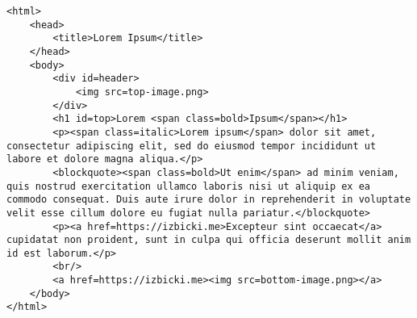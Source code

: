 \documentclass[10pt]{article}
\theoremstyle{definition}
\begin{document}
\newpage
\begin{lstlisting}
<html>
    <head>
        <title>Lorem Ipsum</title>
    </head>
    <body>
        <div id=header>
            <img src=top-image.png>
        </div>
        <h1 id=top>Lorem <span class=bold>Ipsum</span></h1>
        <p><span class=italic>Lorem ipsum</span> dolor sit amet, consectetur adipiscing elit, sed do eiusmod tempor incididunt ut labore et dolore magna aliqua.</p>
        <blockquote><span class=bold>Ut enim</span> ad minim veniam, quis nostrud exercitation ullamco laboris nisi ut aliquip ex ea commodo consequat. Duis aute irure dolor in reprehenderit in voluptate velit esse cillum dolore eu fugiat nulla pariatur.</blockquote>
        <p><a href=https://izbicki.me>Excepteur sint occaecat</a> cupidatat non proident, sunt in culpa qui officia deserunt mollit anim id est laborum.</p>
        <br/>
        <a href=https://izbicki.me><img src=bottom-image.png></a>
    </body>
</html>
\end{lstlisting}
\end{document}

